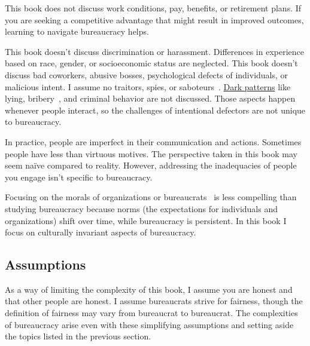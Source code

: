 This book does not discuss work conditions, pay, benefits, or retirement plans. If you are seeking a competitive advantage that might result in improved outcomes, learning to navigate bureaucracy helps.


This book doesn't discuss discrimination or harassment. Differences in experience based on race, gender, or socioeconomic status are neglected. This book doesn't discuss bad coworkers, abusive bosses, psychological defects of individuals, or malicious intent. I assume no traitors, spies, 
or saboteurs~\cite{1944_War_Dept}. \href{https://en.wikipedia.org/wiki/Dark_pattern}{Dark patterns} 
like lying, bribery~\cite{2021_Ang}, and criminal behavior are not discussed. Those aspects happen whenever people interact, so  the challenges of intentional defectors are not unique to bureaucracy. 

In practice, people are imperfect in their communication and actions. Sometimes people have less than virtuous motives. The perspective taken in this book may seem na\"ive compared to reality. 
However, addressing the inadequacies of people you engage isn't specific to bureaucracy.


Focusing on the morals of organizations or bureaucrats~\cite{2009_Jackall} is less compelling than studying bureaucracy because norms (the expectations for individuals and organizations) shift over time, while bureaucracy is persistent. 
In this book I focus on culturally invariant aspects of bureaucracy. 


\subsection*{Assumptions}
As a way of limiting the complexity of this book, I assume you are honest and that other people are honest. 
I assume bureaucrats strive for fairness, though the definition of fairness may vary from bureaucrat to bureaucrat. 
The complexities of bureaucracy arise even with these simplifying assumptions and setting aside the topics listed in the previous section. %


